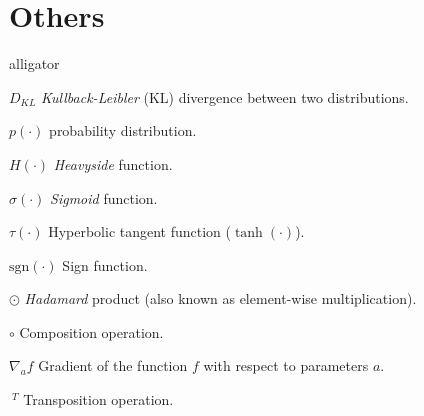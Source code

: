 \section*{Others}
\begin{labeling}{alligator}
	\item [$D_{KL}$] {\textit{Kullback-Leibler} (KL) divergence between two distributions.}
	\item [$p(\cdot)$]{probability distribution.}
	\item [$H(\cdot)$] \textit{Heavyside} function.
	\item [$\sigma(\cdot)$] \textit{Sigmoid} function.
	\item [$\tau(\cdot)$] Hyperbolic tangent function ($\tanh(\cdot)$).
	\item [$\mathrm{sgn}(\cdot)$] Sign function.
	\item [$\odot$] {\textit{Hadamard} product (also known as element-wise multiplication)}.
	\item [$\circ$] Composition operation.
	\item [$\nabla_a f$] Gradient of the function $f$ with respect to parameters $a$.
	\item [$\ ^T$] Transposition operation.

\end{labeling}